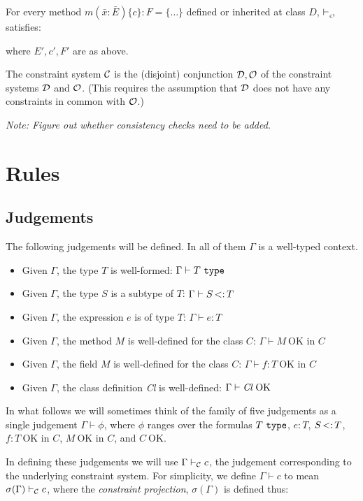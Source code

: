\documentclass[preprint,nocopyrightspace,9pt]{sigplanconf}
\def\mtype{\mbox{\tt mtype}}
\begin{document}
For every method
$m(\bar{x}:\bar{E})\{c\}:F=\{\ldots\}$ defined or inherited at class $D$,
$\vdash_{\cal_O}$ satisfies:

\infax[mtype]{\Gamma,z:D\{d\} \vdash_{\cal O} \mtype(z, m, \bar{x}:\bar{E'},c'\rightarrow F')}

\noindent where $E',c',F'$ are as above.

The constraint system $\cal C$ is the (disjoint) conjunction $\cal
D,O$ of the constraint systems $\cal D$ and $\cal O$. (This requires
the assumption that $\cal D$ does not have any constraints in common
with $\cal O$.)

{\em Note: Figure out whether consistency checks need to be added.}

\section{Rules}

\subsection{Judgements}

The following judgements will be defined. In all of them $\Gamma$ is a
well-typed context.
\begin{itemize}
  \item Given $\Gamma$, the type $T$ is well-formed: $\Gamma \vdash T
  \ {\tt type}$
  \item Given $\Gamma$, the type $S$ is a subtype of $T$: $\Gamma \vdash S \subtype T$
  \item Given $\Gamma$, the expression $e$ is of type $T$: $\Gamma
  \vdash e:T$
  \item Given $\Gamma$, the method $M$ is well-defined for the class $C$: 
  $\Gamma \vdash M\ \mbox{OK in $C$}$
  \item Given $\Gamma$, the field $M$ is well-defined for the class $C$:
    $\Gamma \vdash f:T\ \mbox{OK in $C$}$
  \item Given $\Gamma$, the class definition \mbox{\em Cl} is well-defined: $\Gamma \vdash \mbox{{\em Cl}\ OK}$
\end{itemize}


In what follows we will sometimes think of the family of five
judgements as a single judgement $\Gamma \vdash \phi$, where $\phi$
ranges over the formulas $T\ \tt type$, $e:T$, $S \subtype T$, $f:T\
\mbox{OK in $C$}$, $M\ \mbox{OK in $C$}$, and $C\ \mbox{OK}$.

In defining these judgements we will use $\Gamma \vdash_{\cal C} c$,
the judgement corresponding to the underlying constraint system. For simplicity,
we define $\Gamma \vdash c$ to mean $\sigma(\Gamma)\vdash_{\cal C} c$,
where the {\em constraint projection}, $\sigma(\Gamma)$ is defined thus:
\end{document}
